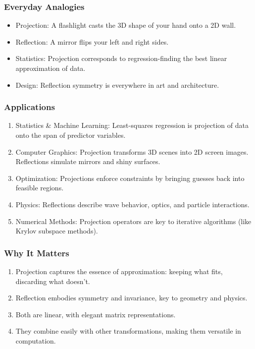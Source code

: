 \documentclass[
  letterpaper,
  DIV=11,
  numbers=noendperiod]{scrreprt}
\providecommand{\tightlist}{%
  \setlength{\itemsep}{0pt}\setlength{\parskip}{0pt}}
\begin{document}
\subsubsection{Everyday Analogies}\label{everyday-analogies-43}

\begin{itemize}
\tightlist
\item
  Projection: A flashlight casts the 3D shape of your hand onto a 2D
  wall.
\item
  Reflection: A mirror flips your left and right sides.
\item
  Statistics: Projection corresponds to regression-finding the best
  linear approximation of data.
\item
  Design: Reflection symmetry is everywhere in art and architecture.
\end{itemize}

\subsubsection{Applications}\label{applications-10}

\begin{enumerate}
\def\labelenumi{\arabic{enumi}.}
\tightlist
\item
  Statistics \& Machine Learning: Least-squares regression is projection
  of data onto the span of predictor variables.
\item
  Computer Graphics: Projection transforms 3D scenes into 2D screen
  images. Reflections simulate mirrors and shiny surfaces.
\item
  Optimization: Projections enforce constraints by bringing guesses back
  into feasible regions.
\item
  Physics: Reflections describe wave behavior, optics, and particle
  interactions.
\item
  Numerical Methods: Projection operators are key to iterative
  algorithms (like Krylov subspace methods).
\end{enumerate}

\subsubsection{Why It Matters}\label{why-it-matters-43}

\begin{enumerate}
\def\labelenumi{\arabic{enumi}.}
\tightlist
\item
  Projection captures the essence of approximation: keeping what fits,
  discarding what doesn't.
\item
  Reflection embodies symmetry and invariance, key to geometry and
  physics.
\item
  Both are linear, with elegant matrix representations.
\item
  They combine easily with other transformations, making them versatile
  in computation.
\end{enumerate}
\end{document}
